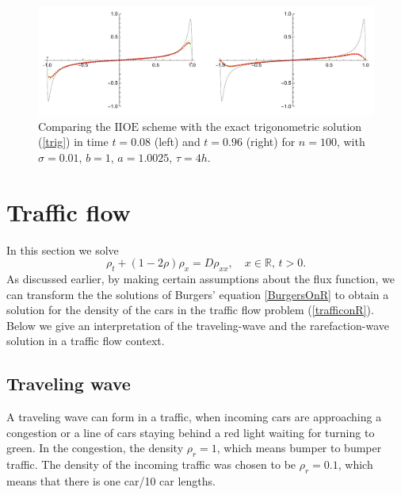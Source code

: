 \documentclass[a4paper,12pt,twoside]{report}%
\begin{document}
\begin{figure}[h!] 
	\centering
	\includegraphics[width=\textwidth]{figures/trig100}
	\caption{Comparing the $\mathrm{IIOE}$ scheme with the exact trigonometric solution {\rm (\ref{trig})} in time $ t = 0.08 $ (left) and $ t = 0.96 $ (right) for $ n=100 $, with $ \sigma=0.01 $, $ b=1 $, $ a=1.0025 $, $ \tau = 4h $.}
	\label{ftrig} 
\end{figure} 

\newpage
\section{Traffic flow}
In this section we solve 
\begin{equation}
	\rho_t + (1 - 2\rho)\rho_x = D \rho_{xx},\quad x\in \mathbb{R},\, t > 0.
	\label{trafficonR}
\end{equation}
As discussed earlier, by making certain assumptions about the flux function, we can transform the the solutions of Burgers' equation \eqref{BurgersOnR} to obtain a solution for the density of the cars in the traffic flow problem (\ref{trafficonR}). Below we give an interpretation of the traveling-wave and the rarefaction-wave solution in a traffic flow context.

\subsection{Traveling wave}
A traveling wave can form in a traffic, when incoming cars are approaching a congestion or a line of cars staying behind a red light waiting for turning to green. In the congestion, the density $ \rho_r = 1 $, which means bumper to bumper traffic. The density of the incoming traffic was chosen to be $ \rho_r = 0.1 $, which means that there is one car/10 car lengths.
\end{document}
